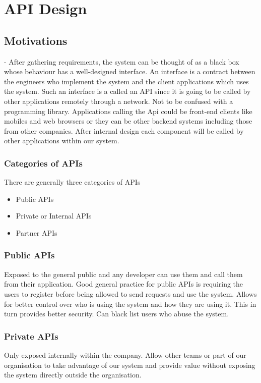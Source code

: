 \chapter{API Design}

\section{Motivations} - After gathering requirements, the system can be thought of as a black box whose behaviour has a well-designed interface.
An interface is a contract between the engineers who implement the system and the client applications which uses the system.
Such an interface is a called an API since it is going to be called by other applications remotely through a network.
Not to be confused with a programming library.
Applications calling the Api could be front-end clients like mobiles and web browsers or they can be other backend systems including those from other companies.
After internal design each component will be called by other applications within our system.

\subsection{Categories of APIs}

There are generally three categories of APIs

\begin{itemize}
    \item Public APIs
    \item Private or Internal APIs
    \item Partner APIs
\end{itemize}

\subsection{Public APIs}
Exposed to the general public and any developer can use them and call them from their application.
Good general practice for public APIs is requiring the users to register before being allowed to send requests and use the system.
Allows for better control over who is using the system and how they are using it.
This in turn provides better security.
Can black list users who abuse the system.

\subsection{Private APIs}
Only exposed internally within the company.
Allow other teams or part of our organisation to take advantage of our system and provide value without exposing the system directly outside the organisation.

